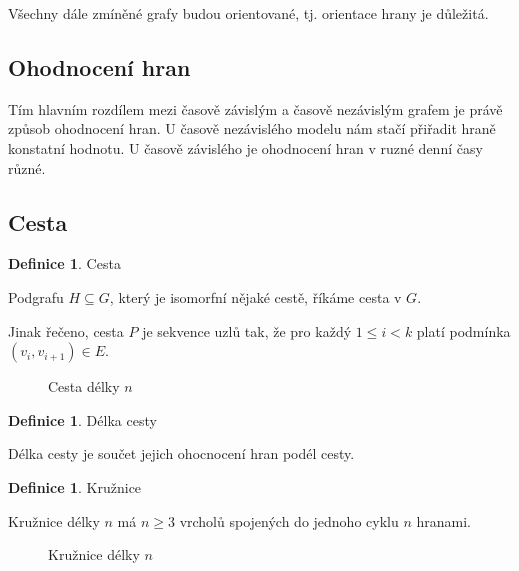 \documentclass[thesis=M,czech]{FITthesis}[2019/12/23]
\theoremstyle{plain}
\theoremstyle{definition}
\newtheorem{defn}[thm]{Definice} %
\begin{document}
Všechny dále zmíněné grafy budou orientované, tj. orientace hrany je důležitá.


\subsection{Ohodnocení hran}

Tím hlavním rozdílem mezi časově závislým a časově nezávislým grafem je právě způsob ohodnocení hran. U časově nezávislého modelu nám stačí přiřadit hraně konstatní hodnotu. U časově závislého je ohodnocení hran v ruzné denní časy různé.

\subsection{Cesta}

\begin{defn}{Cesta}\label{thm:graf}

Podgrafu $H \subseteq	 G$, který je isomorfní nějaké cestě, říkáme cesta v $G$. 
\end{defn}

Jinak řečeno, cesta $P$ je sekvence uzlů tak, že pro každý $1 \leq	i < k$ platí podmínka $(v_i, v_{i+1}) \in	 E$. 

\begin{figure}[H]\centering
	

	\caption[Cesta délky $n$]{Cesta délky $n$}\label{fig:float}
\end{figure}


\begin{defn}{Délka cesty}\label{thm:graf}

	Délka cesty je součet jejich ohocnocení hran podél cesty.
	\end{defn}

	
\begin{defn}{Kružnice}\label{thm:graf}

Kružnice délky $n$ má $n \geq 3$ vrcholů spojených do jednoho cyklu $n$ hranami.
\end{defn}

\begin{figure}[H]\centering
	

	\caption[Kružnice délky $n$]{Kružnice délky $n$}\label{fig:float}
\end{figure}
\end{document}
